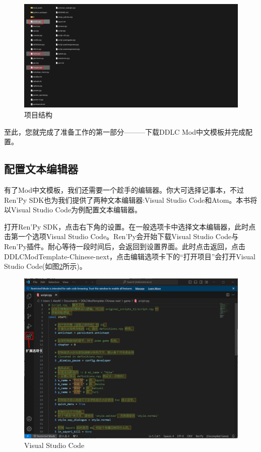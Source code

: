 \begin{figure}[htbp]
    \centering
    \includegraphics[scale=.2]{Pictures/2/2.1/2.1.2}
    \caption{项目结构}
    \label{fig:3.1.1.2}
\end{figure}

至此，您就完成了准备工作的第一部分———下载DDLC Mod中文模板并完成配置。

\subsection{配置文本编辑器}
\label{2.1.2}
有了Mod中文模板，我们还需要一个趁手的编辑器。你大可选择记事本，不过Ren'Py SDK也为我们提供了两种文本编辑器:Visual Studio Code和Atom。本书将以Visual Studio Code为例配置文本编辑器。

打开Ren'Py SDK，点击右下角的设置。在一般选项卡中选择文本编辑器，此时点击第一个选项Visual Studio Code。Ren'Py会开始下载Visual Studio Code与Ren'Py插件。耐心等待一段时间后，会返回到设置界面。此时点击返回，点击DDLCModTemplate-Chinese-next，点击编辑选项卡下的“打开项目”会打开Visual Studio Code(如图\ref{fig:3.1.2.1}所示)。

\begin{figure}[htbp]
    \centering
    \includegraphics[scale=.4]{Pictures/2/2.1/2.1.3}
    \caption{Visual Studio Code}
    \label{fig:3.1.2.1}
\end{figure}


